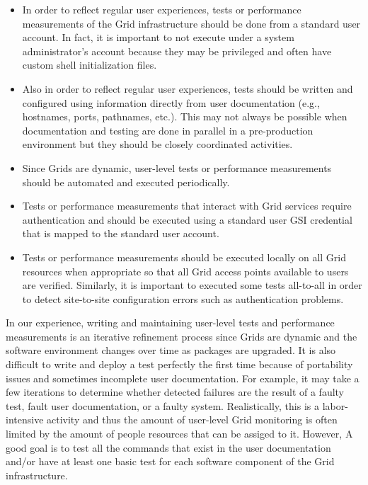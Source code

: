 \documentclass[times, 10pt,twocolumn]{article}
\begin{document}
\begin{itemize}

\item In order to reflect regular user experiences, tests or performance
measurements of the Grid infrastructure should be done from a standard user
account.  In fact, it is important to not execute under a system
administrator's account because they may be privileged and often have custom
shell initialization files.

\item Also in order to reflect regular user experiences, tests should be
written and configured using information directly from user documentation
(e.g., hostnames, ports, pathnames, etc.).  This may not always be possible
when documentation and testing are done in parallel in a pre-production
environment but they should be closely coordinated activities. 

\item Since Grids are dynamic, user-level tests or performance measurements
should be automated and executed periodically.

\item Tests or performance measurements that interact with Grid services
require authentication and should be executed using a standard user GSI
credential that is mapped to the standard user account.  

\item Tests or performance measurements should be executed locally on all Grid
resources when appropriate so that all Grid access points available to users
are verified.  Similarly, it is important to executed some tests all-to-all
in order to detect site-to-site configuration errors such as authentication
problems.

\end{itemize}

\noindent In our experience, writing and maintaining user-level tests and
performance measurements is an iterative refinement process since Grids are
dynamic and the software environment changes over time as packages are
upgraded.  It is also difficult to write and deploy a test perfectly the first
time because of portability issues and sometimes incomplete user
documentation.  For example, it may take a few iterations to determine whether
detected failures are the result of a faulty test, fault user documentation,
or a faulty system.  Realistically, this is a labor-intensive activity and
thus the amount of user-level Grid monitoring is often limited by the amount
of people resources that can be assiged to it.  However, A good goal is to
test all the commands that exist in the user documentation and/or have at
least one basic test for each software component of the Grid infrastructure.  
\end{document}
